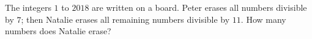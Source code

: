 The integers $1$ to $2018$ are written on a board. Peter erases all numbers divisible by $7$; then Natalie erases all remaining numbers divisible by $11$. How many numbers does Natalie erase?
